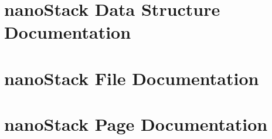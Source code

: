 \documentclass[a4paper]{book}
\begin{document}
\chapter{nano\-Stack Data Structure Documentation}


















































\chapter{nano\-Stack File Documentation}



















































\chapter{nano\-Stack Page Documentation}

\printindex
\end{document}
